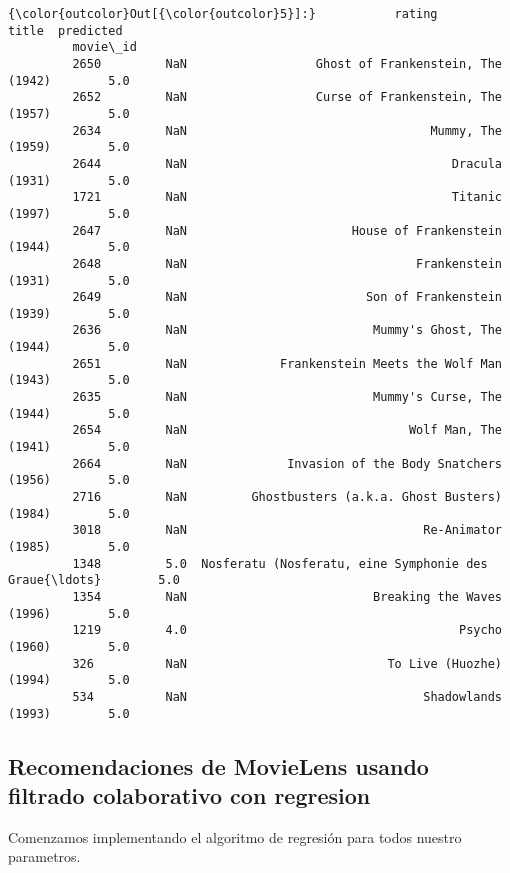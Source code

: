 \documentclass[11pt]{article}
\begin{document}
\begin{Verbatim}[commandchars=\\\{\}]
{\color{outcolor}Out[{\color{outcolor}5}]:}           rating                                              title  predicted
         movie\_id
         2650         NaN                  Ghost of Frankenstein, The (1942)        5.0
         2652         NaN                  Curse of Frankenstein, The (1957)        5.0
         2634         NaN                                  Mummy, The (1959)        5.0
         2644         NaN                                     Dracula (1931)        5.0
         1721         NaN                                     Titanic (1997)        5.0
         2647         NaN                       House of Frankenstein (1944)        5.0
         2648         NaN                                Frankenstein (1931)        5.0
         2649         NaN                         Son of Frankenstein (1939)        5.0
         2636         NaN                          Mummy's Ghost, The (1944)        5.0
         2651         NaN             Frankenstein Meets the Wolf Man (1943)        5.0
         2635         NaN                          Mummy's Curse, The (1944)        5.0
         2654         NaN                               Wolf Man, The (1941)        5.0
         2664         NaN              Invasion of the Body Snatchers (1956)        5.0
         2716         NaN         Ghostbusters (a.k.a. Ghost Busters) (1984)        5.0
         3018         NaN                                 Re-Animator (1985)        5.0
         1348         5.0  Nosferatu (Nosferatu, eine Symphonie des Graue{\ldots}        5.0
         1354         NaN                          Breaking the Waves (1996)        5.0
         1219         4.0                                      Psycho (1960)        5.0
         326          NaN                            To Live (Huozhe) (1994)        5.0
         534          NaN                                 Shadowlands (1993)        5.0
\end{Verbatim}

\subsection{Recomendaciones de MovieLens usando filtrado colaborativo con regresion}
\label{subsec:a4}

Comenzamos implementando el algoritmo de regresión para todos nuestro parametros.
\end{document}
